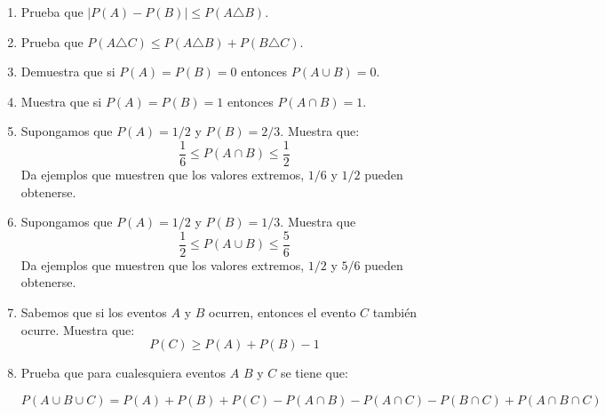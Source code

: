 \documentclass[12pt]{extreport}
\begin{document}
\begin{enumerate}
    \item Prueba que $\left|P(A)-P(B)\right|\leq P(A\triangle B)$.
    \item Prueba que $P(A\triangle C)\leq P(A\triangle B) + P(B\triangle C)$.
    \item Demuestra que si $P(A) = P(B) = 0 $ entonces $P(A\cup B) = 0$.
    \item Muestra que si $P(A) = P(B) = 1$ entonces $P(A\cap B) = 1$.
    \item Supongamos que $P(A)= 1/2$ y $P(B)= 2/3$. Muestra que:
          $$
              \frac{1}{6} \leq P(A\cap B) \leq \frac{1}{2}
          $$
          Da ejemplos que muestren que los valores extremos, $1/6$ y $1/2$ pueden obtenerse.
    \item Supongamos que $P(A) = 1/2$ y $P(B) = 1/3$. Muestra que
          $$
              \frac{1}{2}\leq P(A\cup B)\leq \frac{5}{6}
          $$
          Da ejemplos que muestren que los valores extremos, $1/2$ y $5/6$ pueden obtenerse.

    \item Sabemos que si los eventos $A$ y $B$ ocurren, entonces el evento $C$ también ocurre. Muestra que:
          $$
              P(C) \geq P(A) + P(B) - 1
          $$
    \item Prueba que para cualesquiera eventos $A$ $B$ y $C$ se tiene que:

          $$
              P(A\cup B \cup C) = P(A) + P(B) + P(C) - P(A\cap B) - P(A\cap C) - P(B\cap C) + P(A\cap B\cap C)
          $$
\end{enumerate}
\end{document}
